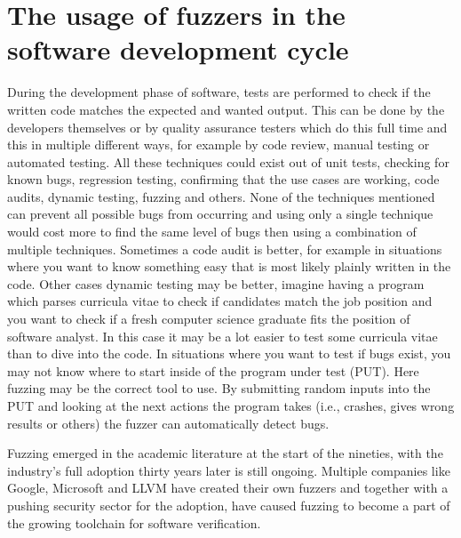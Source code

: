 \section{The usage of fuzzers in the software development cycle}
\label{intro:SoftwareDevelopmentCycle}
During the development phase of software, tests are performed to check if the written code matches the expected and wanted output. This can be done by the developers themselves or by quality assurance testers which do this full time and this in multiple different ways, for example by code review, manual testing or automated testing. All these techniques could exist out of unit tests, checking for known bugs, regression testing, confirming that the use cases are working, code audits, dynamic testing, fuzzing and others. None of the techniques mentioned can prevent all possible bugs from occurring and using only a single technique would cost more to find the same level of bugs then using a combination of multiple techniques. Sometimes a code audit is better, for example in situations where you want to know something easy that is most likely plainly written in the code. Other cases dynamic testing may be better, imagine having a program which parses curricula vitae to check if candidates match the job position and you want to check if a fresh computer science graduate fits the position of software analyst. In this case it may be a lot easier to test some curricula vitae than to dive into the code. In situations where you want to test if bugs exist, you may not know where to start inside of the program under test (PUT). Here fuzzing may be the correct tool to use. By submitting random inputs into the PUT and looking at the next actions the program takes (i.e., crashes, gives wrong results or others) the fuzzer can automatically detect bugs.

Fuzzing emerged in the academic literature at the start of the nineties, with the industry’s full adoption thirty years later is still ongoing. Multiple companies like Google, Microsoft and LLVM have created their own fuzzers and together with a pushing security sector for the adoption, have caused fuzzing to become a part of the growing toolchain for software verification.


